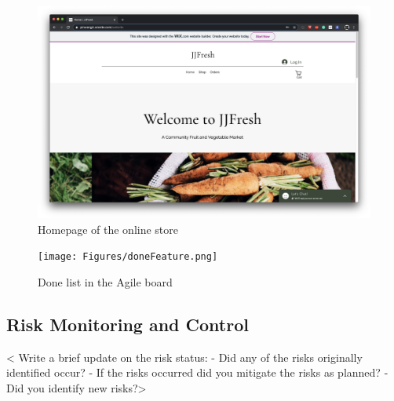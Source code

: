 \documentclass{report}
\begin{document}
\begin{figure}[htp]
\centering
\includegraphics[width=\textwidth]{Figures/homepage.png}
\caption{Homepage of the online store}
\label{fig:homepage}
\end{figure}

\begin{figure}[htp]
\centering
\texttt{[image: Figures/doneFeature.png]}
\caption{Done list in the Agile board}
\label{fig:doneFeature}
\end{figure}


\clearpage
\subsection{Risk Monitoring and Control}
< Write a brief update on the risk status:
- Did any of the risks originally identified occur?
- If the risks occurred did you mitigate the risks as planned?
- Did you identify new risks?>
\end{document}
